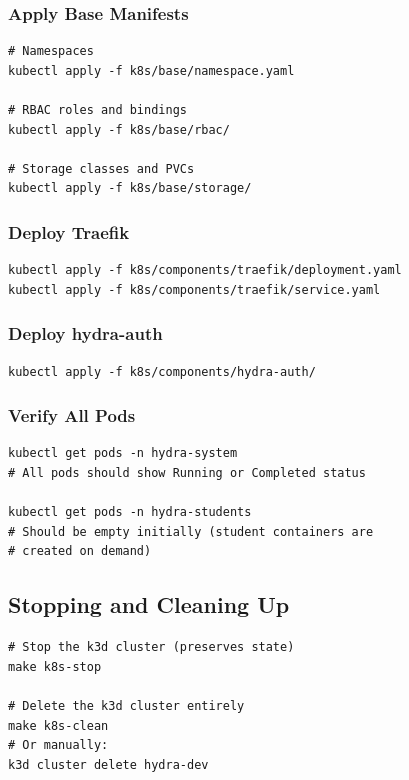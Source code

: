 \documentclass[11pt,a4paper]{article}
\begin{document}
\subsubsection{Apply Base Manifests}

\begin{lstlisting}[style=bash]
# Namespaces
kubectl apply -f k8s/base/namespace.yaml

# RBAC roles and bindings
kubectl apply -f k8s/base/rbac/

# Storage classes and PVCs
kubectl apply -f k8s/base/storage/
\end{lstlisting}

\subsubsection{Deploy Traefik}

\begin{lstlisting}[style=bash]
kubectl apply -f k8s/components/traefik/deployment.yaml
kubectl apply -f k8s/components/traefik/service.yaml
\end{lstlisting}

\subsubsection{Deploy hydra-auth}

\begin{lstlisting}[style=bash]
kubectl apply -f k8s/components/hydra-auth/
\end{lstlisting}

\subsubsection{Verify All Pods}

\begin{lstlisting}[style=bash]
kubectl get pods -n hydra-system
# All pods should show Running or Completed status

kubectl get pods -n hydra-students
# Should be empty initially (student containers are
# created on demand)
\end{lstlisting}

\subsection{Stopping and Cleaning Up}

\begin{lstlisting}[style=bash]
# Stop the k3d cluster (preserves state)
make k8s-stop

# Delete the k3d cluster entirely
make k8s-clean
# Or manually:
k3d cluster delete hydra-dev
\end{lstlisting}
\end{document}
